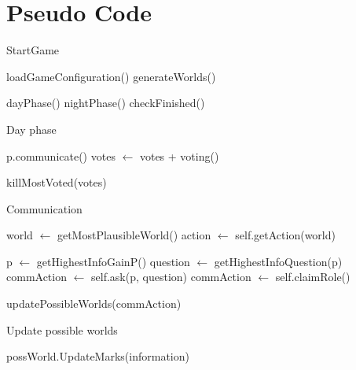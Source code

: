 \section{Pseudo Code}\label{app:B}
\begin{algorithm}
	\caption{StartGame}
	\begin{algorithmic}[1]
		\State loadGameConfiguration()
		\State generateWorlds()

		\State dayPhase()
		\State nightPhase()
		\State checkFinished()
		\EndWhile
		\EndFunction
	\end{algorithmic}
\end{algorithm}

\begin{algorithm}
	\caption{Day phase}
	\begin{algorithmic}[1]
		\State p.communicate()
		\EndFor
		\State votes $\gets$ votes + voting()
		\EndFor

		\State killMostVoted(votes)
		\EndFunction
	\end{algorithmic}
\end{algorithm}

\begin{algorithm}
	\caption{Communication}
	\begin{algorithmic}[1]
		\State world $\gets$ getMostPlausibleWorld()
		\State action $\gets$ self.getAction(world)

		\State p $\gets$ getHighestInfoGainP()
		\State question $\gets$ getHighestInfoQuestion(p)
		\State commAction $\gets$ self.ask(p, question)
		\State commAction $\gets$ self.claimRole()
		\EndIf

		\State updatePossibleWorlds(commAction)
		\EndFunction
	\end{algorithmic}
\end{algorithm}

\begin{algorithm}
	\caption{Update possible worlds}
	\begin{algorithmic}[1]
		\State possWorld.UpdateMarks(information)
		\EndFor
		\EndFor
		\EndFunction
	\end{algorithmic}
\end{algorithm}

